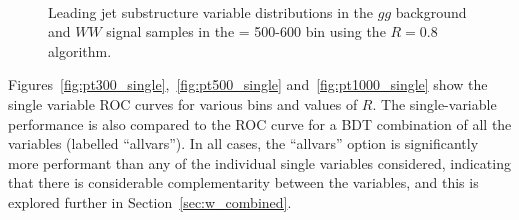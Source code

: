 \begin{figure}
\centering
{}
\\
\caption{Leading jet substructure variable distributions in the $gg$
  background and $WW$ signal samples in the \pt = 500-600 \GeV bin using the \antikt $R=0.8$ algorithm.}
\label{fig:pt500_subst_AKt_R08}
\end{figure}


Figures~\ref{fig:pt300_single},~\ref{fig:pt500_single}
and~\ref{fig:pt1000_single} show the single variable ROC curves
for various \pt bins and values of $R$. The single-variable performance is also
compared to the ROC curve for a BDT combination of all the variables
(labelled ``allvars''). In all cases, the ``allvars'' option
is significantly more performant than any of the individual single variables
considered, indicating that there is considerable complementarity
between the variables, and this is explored further in Section~\ref{sec:w_combined}.


